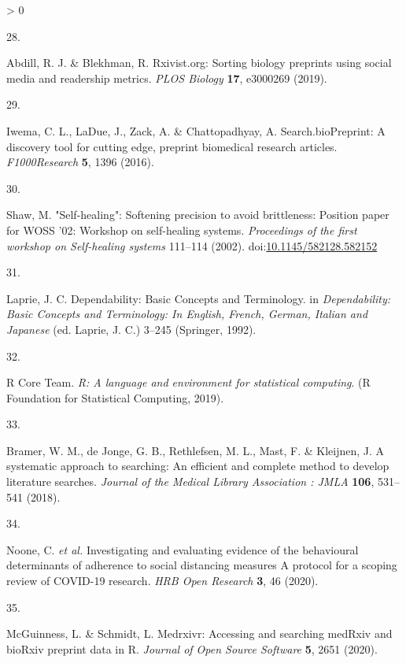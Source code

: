 \documentclass[a4paper, twoside]{templates/ociamthesis}
\newlength{\cslhangindent}
\newlength{\csllabelwidth}
\newenvironment{CSLReferences}[3] %
 {%
  \setlength{\parindent}{0pt}
  \ifodd #1 \everypar{\setlength{\hangindent}{\cslhangindent}}\ignorespaces\fi
  \ifnum #2 > 0
  \setlength{\parskip}{#2\baselineskip}
  \fi
 }%
 {}
\newcommand{\CSLLeftMargin}[1]{\parbox[t]{\maxof{\widthof{#1}}{\csllabelwidth}}{#1}}
\newcommand{\CSLRightInline}[1]{\parbox[t]{\linewidth - \csllabelwidth}{#1}}
\begin{document}
\begin{CSLReferences}{0}{0}
\leavevmode\hypertarget{ref-abdill2019}{}%
\CSLLeftMargin{28. }
\CSLRightInline{Abdill, R. J. \& Blekhman, R. Rxivist.org: {Sorting} biology preprints using social media and readership metrics. \emph{PLOS Biology} \textbf{17}, e3000269 (2019).}

\leavevmode\hypertarget{ref-iwema2016}{}%
\CSLLeftMargin{29. }
\CSLRightInline{Iwema, C. L., LaDue, J., Zack, A. \& Chattopadhyay, A. Search.{bioPreprint}: A discovery tool for cutting edge, preprint biomedical research articles. \emph{F1000Research} \textbf{5}, 1396 (2016).}

\leavevmode\hypertarget{ref-shaw2002}{}%
\CSLLeftMargin{30. }
\CSLRightInline{Shaw, M. "{Self}-healing": Softening precision to avoid brittleness: Position paper for {WOSS} '02: Workshop on self-healing systems. \emph{Proceedings of the first workshop on Self-healing systems} 111--114 (2002). doi:\href{https://doi.org/10.1145/582128.582152}{10.1145/582128.582152}}

\leavevmode\hypertarget{ref-laprie1992}{}%
\CSLLeftMargin{31. }
\CSLRightInline{Laprie, J. C. Dependability: {Basic Concepts} and {Terminology}. in \emph{Dependability: {Basic Concepts} and {Terminology}: {In English}, {French}, {German}, {Italian} and {Japanese}} (ed. Laprie, J. C.) 3--245 ({Springer}, 1992).}

\leavevmode\hypertarget{ref-rcoreteam2019}{}%
\CSLLeftMargin{32. }
\CSLRightInline{R Core Team. \emph{R: {A} language and environment for statistical computing}. ({R Foundation for Statistical Computing}, 2019).}

\leavevmode\hypertarget{ref-bramer2018}{}%
\CSLLeftMargin{33. }
\CSLRightInline{Bramer, W. M., de Jonge, G. B., Rethlefsen, M. L., Mast, F. \& Kleijnen, J. A systematic approach to searching: An efficient and complete method to develop literature searches. \emph{Journal of the Medical Library Association : JMLA} \textbf{106}, 531--541 (2018).}

\leavevmode\hypertarget{ref-noone2020}{}%
\CSLLeftMargin{34. }
\CSLRightInline{Noone, C. \emph{et al.} Investigating and evaluating evidence of the behavioural determinants of adherence to social distancing measures {} {A} protocol for a scoping review of {COVID}-19 research. \emph{HRB Open Research} \textbf{3}, 46 (2020).}

\leavevmode\hypertarget{ref-mcguinness2020a}{}%
\CSLLeftMargin{35. }
\CSLRightInline{McGuinness, L. \& Schmidt, L. Medrxivr: {Accessing} and searching {medRxiv} and {bioRxiv} preprint data in {R}. \emph{Journal of Open Source Software} \textbf{5}, 2651 (2020).}


\end{CSLReferences}
\end{document}
